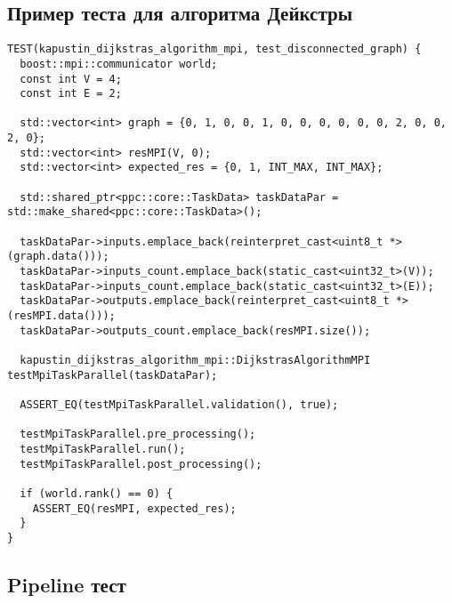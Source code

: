 \documentclass[a4paper,14pt]{extarticle}
\begin{document}
\subsection{Пример теста для алгоритма Дейкстры}


\begin{lstlisting}[caption={Пример теста  на разорванном графе}]
TEST(kapustin_dijkstras_algorithm_mpi, test_disconnected_graph) {
  boost::mpi::communicator world;
  const int V = 4;
  const int E = 2;

  std::vector<int> graph = {0, 1, 0, 0, 1, 0, 0, 0, 0, 0, 0, 2, 0, 0, 2, 0};
  std::vector<int> resMPI(V, 0);
  std::vector<int> expected_res = {0, 1, INT_MAX, INT_MAX};

  std::shared_ptr<ppc::core::TaskData> taskDataPar = std::make_shared<ppc::core::TaskData>();

  taskDataPar->inputs.emplace_back(reinterpret_cast<uint8_t *>(graph.data()));
  taskDataPar->inputs_count.emplace_back(static_cast<uint32_t>(V));
  taskDataPar->inputs_count.emplace_back(static_cast<uint32_t>(E));
  taskDataPar->outputs.emplace_back(reinterpret_cast<uint8_t *>(resMPI.data()));
  taskDataPar->outputs_count.emplace_back(resMPI.size());

  kapustin_dijkstras_algorithm_mpi::DijkstrasAlgorithmMPI testMpiTaskParallel(taskDataPar);

  ASSERT_EQ(testMpiTaskParallel.validation(), true);

  testMpiTaskParallel.pre_processing();
  testMpiTaskParallel.run();
  testMpiTaskParallel.post_processing();

  if (world.rank() == 0) {
    ASSERT_EQ(resMPI, expected_res);
  }
}
\end{lstlisting}
\clearpage
\subsection{Pipeline тест}

\end{document}
